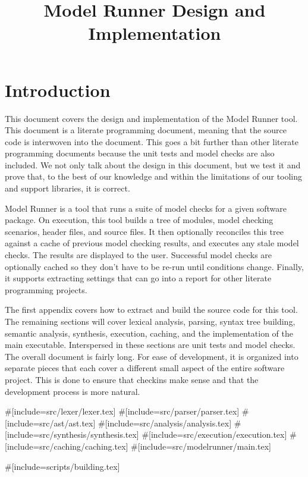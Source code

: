 \title{Model Runner Design and Implementation}

\section{Introduction}

This document covers the design and implementation of the Model Runner tool.
This document is a literate programming document, meaning that the source code
is interwoven into the document. This goes a bit further than other literate
programming documents because the unit tests and model checks are also included.
We not only talk about the design in this document, but we test it and prove
that, to the best of our knowledge and within the limitations of our tooling and
support libraries, it is correct.

Model Runner is a tool that runs a suite of model checks for a given software
package. On execution, this tool builds a tree of modules, model checking
scenarios, header files, and source files. It then optionally reconciles this
tree against a cache of previous model checking results, and executes any stale
model checks.  The results are displayed to the user.  Successful model checks
are optionally cached so they don't have to be re-run until conditions change.
Finally, it supports extracting settings that can go into a report for other
literate programming projects.

The first appendix covers how to extract and build the source code for this
tool.  The remaining sections will cover lexical analysis, parsing, syntax tree
building, semantic analysis, synthesis, execution, caching, and the
implementation of the main executable.  Interspersed in these sections are unit
tests and model checks.  The overall document is fairly long.  For ease of
development, it is organized into separate pieces that each cover a different
small aspect of the entire software project. This is done to ensure that
checkins make sense and that the development process is more natural.

#[include=src/lexer/lexer.tex]
#[include=src/parser/parser.tex]
#[include=src/ast/ast.tex]
#[include=src/analysis/analysis.tex]
#[include=src/synthesis/synthesis.tex]
#[include=src/execution/execution.tex]
#[include=src/caching/caching.tex]
#[include=src/modelrunner/main.tex]

\appendix

#[include=scripts/building.tex]
